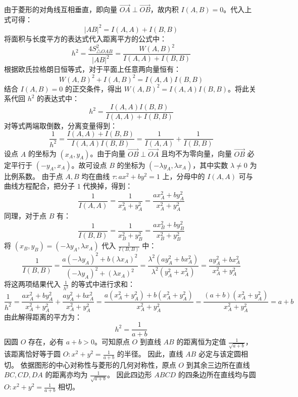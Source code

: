 \begin{solution}
由于菱形的对角线互相垂直，即向量 $\overrightarrow{OA} \perp \overrightarrow{OB}$，故内积 $I(A,B) = 0$。代入上式可得：
\[ |AB|^2 = I(A,A) + I(B,B) \]
将面积与长度平方的表达式代入距离平方的公式中：
\[ h^2 = \frac{4 S_{\triangle OAB}^2}{|AB|^2} = \frac{W(A,B)^2}{I(A,A) + I(B,B)} \]
根据欧氏拉格朗日恒等式，对于平面上任意两向量恒有：
\[ W(A,B)^2 + I(A,B)^2 = I(A,A)I(B,B) \]
结合 $I(A,B) = 0$ 的正交条件，得出 $W(A,B)^2 = I(A,A)I(B,B)$。将此关系代回 $h^2$ 的表达式中：
\[ h^2 = \frac{I(A,A)I(B,B)}{I(A,A) + I(B,B)} \]
对等式两端取倒数，分离变量得到：
\[ \frac{1}{h^2} = \frac{I(A,A) + I(B,B)}{I(A,A)I(B,B)} = \frac{1}{I(A,A)} + \frac{1}{I(B,B)} \]
设点 $A$ 的坐标为 $(x_A, y_A)$。由于向量 $\overrightarrow{OB} \perp \overrightarrow{OA}$ 且均不为零向量，向量 $\overrightarrow{OB}$ 必定平行于 $(-y_A, x_A)$。故可设点 $B$ 的坐标为 $(-\lambda y_A, \lambda x_A)$，其中实数 $\lambda \neq 0$ 为比例系数。
由于点 $A, B$ 均在曲线 $\tau: ax^2 + by^2 = 1$ 上，分母中的 $I(A,A)$ 可与曲线方程配合，把分子 $1$ 代换掉，得到：
\[ \frac{1}{I(A,A)} = \frac{1}{x_A^2 + y_A^2} = \frac{a x_A^2 + b y_A^2}{x_A^2 + y_A^2} \]
同理，对于点 $B$ 有：
\[ \frac{1}{I(B,B)} = \frac{1}{x_B^2 + y_B^2} = \frac{a x_B^2 + b y_B^2}{x_B^2 + y_B^2} \]
将 $(x_B, y_B) = (-\lambda y_A, \lambda x_A)$ 代入 $\frac{1}{I(B,B)}$ 中：
\[ \frac{1}{I(B,B)} = \frac{a(-\lambda y_A)^2 + b(\lambda x_A)^2}{(-\lambda y_A)^2 + (\lambda x_A)^2} = \frac{\lambda^2(a y_A^2 + b x_A^2)}{\lambda^2(y_A^2 + x_A^2)} = \frac{a y_A^2 + b x_A^2}{x_A^2 + y_A^2} \]
将这两项结果代入 $\frac{1}{h^2}$ 的等式中进行求和：
\[ \frac{1}{h^2} = \frac{a x_A^2 + b y_A^2}{x_A^2 + y_A^2} + \frac{a y_A^2 + b x_A^2}{x_A^2 + y_A^2} = \frac{a(x_A^2 + y_A^2) + b(x_A^2 + y_A^2)}{x_A^2 + y_A^2} = \frac{(a+b)(x_A^2 + y_A^2)}{x_A^2 + y_A^2} = a + b \]
由此解得距离的平方为：
\[ h^2 = \frac{1}{a + b} \]
因圆 $O$ 存在，必有 $a+b > 0$。可知原点 $O$ 到直线 $AB$ 的距离恒为定值 $\frac{1}{\sqrt{a+b}}$，该距离恰好等于圆 $O: x^2 + y^2 = \frac{1}{a+b}$ 的半径。
因此，直线 $AB$ 必定与该定圆相切。
依据图形的中心对称性与菱形的几何对称性，原点 $O$ 到其余三边所在直线 $BC, CD, DA$ 的距离亦均为 $\frac{1}{\sqrt{a+b}}$。
因此四边形 $ABCD$ 的四条边所在直线均与圆 $O: x^2 + y^2 = \frac{1}{a + b}$ 相切。
\end{solution}



